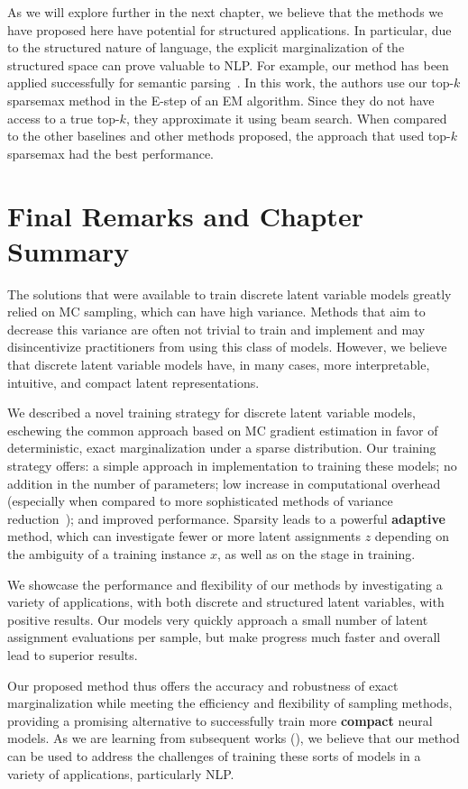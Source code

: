 As we will explore further in the next chapter, we believe that the
methods we have proposed here have potential for structured
applications. In particular, due to the structured nature of
language, the explicit marginalization of the structured space can
prove valuable to NLP. For example, our method has been applied
successfully for semantic
parsing~\citep{wang2021LearningExecutionsSemantic}. In this work, the
authors use our top-$k$ sparsemax method in the E-step of an EM
algorithm. Since they do not have access to a true top-$k$, they
approximate it using beam search. When compared to the other
baselines and other methods proposed, the approach that used top-$k$
sparsemax had the best performance.

\section{Final Remarks and Chapter Summary}

\noindent The solutions that were available to train discrete latent variable
models greatly relied on MC sampling, which can have high variance.
Methods that aim to decrease this variance are often not trivial to
train and implement and may disincentivize practitioners from
using this class of models. However, we believe that discrete latent variable models
have, in many cases, more interpretable, intuitive, and compact
latent representations.

We described a novel training strategy for discrete latent variable
models, eschewing the common approach based on MC gradient estimation
in favor of deterministic, exact marginalization under a sparse
distribution. Our training strategy offers: a simple approach in
implementation to training these models; no addition in the number of
parameters; low increase in computational overhead (especially when
compared to more sophisticated methods of variance
reduction~\citep{RB19}); and improved performance.
Sparsity leads to a powerful \textbf{adaptive} method,
which can investigate fewer or more latent assignments $z$ depending
on the ambiguity of a training instance $x$, as well as on the stage
in training.

We showcase the performance and flexibility of our
methods by investigating a variety of applications, with both discrete
and structured latent variables, with positive results. Our models
very quickly approach a small number of latent assignment evaluations
per sample, but make progress much faster and overall lead to
superior results.

Our proposed method thus offers the accuracy and robustness of exact
marginalization while meeting the efficiency and flexibility of sampling
methods, providing a promising alternative to
successfully train more \textbf{compact} neural models. As we are
learning from subsequent works (), we believe
that our method can be used to address the challenges of training
these sorts of models in a variety of applications, particularly NLP.

\cleardoublepage

\singlespacing